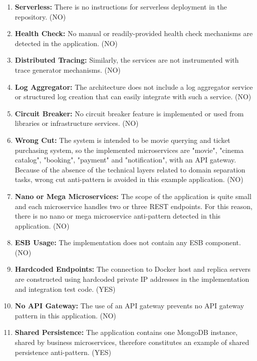 \documentclass{Configuration_Files/PoliMi3i_thesis}
\begin{document}
\begin{enumerate}
    \item \textbf{Serverless:} There is no instructions for serverless deployment in the repository. (NO)
    
    \item \textbf{Health Check:} No manual or readily-provided health check mechanisms are detected in the application. (NO)
    
    \item \textbf{Distributed Tracing:} Similarly, the services are not instrumented with trace generator mechanisms. (NO)
    
    \item \textbf{Log Aggregator:} The architecture does not include a log aggregator service or structured log creation that can easily integrate with such a service. (NO)
    
    \item \textbf{Circuit Breaker:} No circuit breaker feature is implemented or used from libraries or infrastructure services. (NO)
    
    \item \textbf{Wrong Cut:} The system is intended to be movie querying and ticket purchasing system, so the implemented microservices are "movie", "cinema catalog", "booking", "payment" and "notification", with an API gateway.
    Because of the absence of the technical layers related to domain separation tasks, wrong cut anti-pattern is avoided in this example application. (NO)
    
    \item \textbf{Nano or Mega Microservices:} The scope of the application is quite small and each microservice handles two or three REST endpoints.
    For this reason, there is no nano or mega microservice anti-pattern detected in this application. (NO)
    
    \item \textbf{ESB Usage:} The implementation does not contain any ESB component. (NO)
    
    \item \textbf{Hardcoded Endpoints:} The connection to Docker host and replica servers are constructed using hardcoded private IP addresses in the implementation and integration test code. (YES)
    
    \item \textbf{No API Gateway:} The use of an API gateway prevents no API gateway pattern in this application. (NO)
    
    \item \textbf{Shared Persistence:} The application contains one MongoDB instance, shared by business microservices, therefore constitutes an example of shared persistence anti-pattern. (YES)
    

\end{enumerate}
\end{document}
